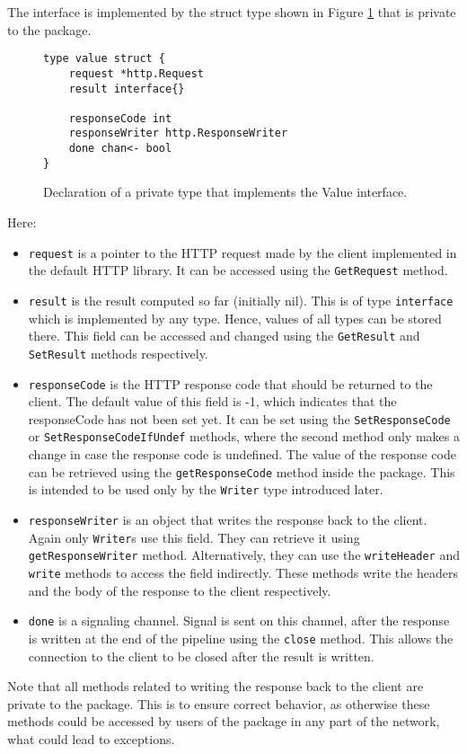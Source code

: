 The interface is implemented by the struct type shown in Figure \ref{fig:value}
that is private to the package.
\newpage
\begin{figure}[h]
\centering
\begin{lstlisting}
type value struct {
    request *http.Request
    result interface{}

    responseCode int
    responseWriter http.ResponseWriter
    done chan<- bool
}
\end{lstlisting}
\caption[scale=1.0]{Declaration of a private type that implements the Value 
interface.}
\label{fig:value}
\end{figure}
Here:
\begin{itemize}
  \item \texttt{request} is a pointer to the HTTP request made by the 
        client implemented in the default HTTP library. It can be accessed
        using the \texttt{GetRequest} method. 

  \item \texttt{result} is the result computed so far (initially nil). This is
        of type \texttt{interface{}} which is implemented by any type.
        Hence, values of all types can be stored there. This field can be
        accessed and changed using the \texttt{GetResult} and \texttt{SetResult}
        methods respectively.
  
  \item \texttt{responseCode} is the HTTP response code that should be 
        returned to the client. The default value of this field is -1,
        which indicates that the responseCode has not been set yet. 
        It can be set using the \texttt{SetResponseCode} or 
        \texttt{SetResponseCodeIfUndef} methods, where the second method only
        makes a change in case the response code is undefined. The value
        of the response code can be retrieved using the \texttt{getResponseCode}
        method inside the package. This is intended to be used only by the 
        \texttt{Writer} type introduced later.

  \item \texttt{responseWriter} is an object that writes the response back 
        to the client. Again only \texttt{Writer}s use this field. They
        can retrieve it using \texttt{getResponseWriter} method. 
        Alternatively, they can use the \texttt{writeHeader} and
        \texttt{write} methods to access the field indirectly.
        These methods write the headers and 
        the body of the response to the client respectively.

  \item \texttt{done} is a signaling channel. Signal is sent on this channel,
		after the response is written at the end of the pipeline using the 
        \texttt{close} method. This allows the connection to the client to 
        be closed after the result is written.
\end{itemize}
Note that all methods related to writing the response back to the client
are private to the package. This is to ensure correct behavior, as otherwise
these methods could be accessed by users of the package in any part of the 
network, what could lead to exceptions.

